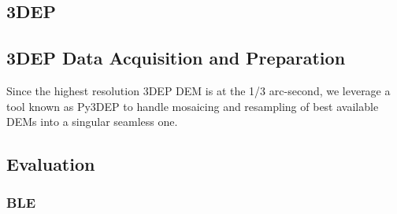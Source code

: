 \documentclass[preprint,review,12pt]{dependencies/elsarticle}
\begin{document}
\subsection{\ac{3DEP}}
\label{ssec:3dep}
%

\begin{comment}
Table \ref{tab:tnm_layer_specifications} illustrates the various elevation layers of \ac{TNM} along with their respective specifications and sources.
\begin{table}[h!]
 \begin{center}
  \caption{\acf{TNM} - Elevation layers specifications. These layers are also known as the \acf{NED}}
  \label{tab:tnm_layer_specifications}
  \begin{tabular}{c|c|c|c|c|c} %
   \multirow{2}*{Layer} & \multicolumn{2}{|c|}{Spatial Resolution} & \multicolumn{2}{|c|}{Accuracy (\ac{m})} & \multirow{2}*{Sources} \\
    & arc-second & (\ac{m}) & Horizontal & Vertical &  \\
   \hline
   1/3 arc-second seamless & 1/3 & 10 & varies & varies & Many  \\
   \hline
  \end{tabular}
 \end{center}
\end{table}
\end{comment}
%
\subsection{\ac{3DEP} Data Acquisition and Preparation}
\label{ssec:py3dep}
%
Since the highest resolution \ac{3DEP} \ac{DEM} is at the 1/3 arc-second, we leverage a tool known as \ac{Py3DEP} to handle mosaicing and resampling of best available \acp{DEM} into a singular seamless one.
%
\subsection{Evaluation}
\label{ssec:evaluation}
%
%
\subsubsection{\ac{BLE}}
\label{sssec:ble}
%
\end{document}
